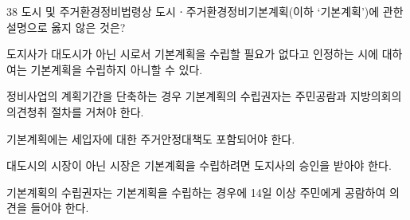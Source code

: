 \begin{question}{38}
도시 및 주거환경정비법령상 도시ㆍ주거환경정비기본계획(이하 ‘기본계획’)에 관한 설명으로 옳지 않은 것은?
\begin{choices}
  \item 도지사가 대도시가 아닌 시로서 기본계획을 수립할 필요가 없다고 인정하는 시에 대하여는 기본계획을 수립하지 아니할 수 있다.
  \item 정비사업의 계획기간을 단축하는 경우 기본계획의 수립권자는 주민공람과 지방의회의 의견청취 절차를 거쳐야 한다.
  \item 기본계획에는 세입자에 대한 주거안정대책도 포함되어야 한다.
  \item 대도시의 시장이 아닌 시장은 기본계획을 수립하려면 도지사의 승인을 받아야 한다.
  \item 기본계획의 수립권자는 기본계획을 수립하는 경우에 14일 이상 주민에게 공람하여 의견을 들어야 한다.
\end{choices}
\end{question}
